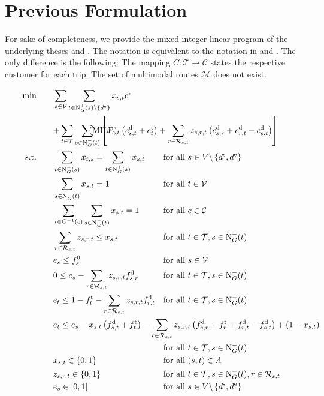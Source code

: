 \section*{Previous Formulation}

For sake of completeness, we provide the mixed-integer linear program of the underlying theses \cite[p.~34]{Kaiser} and \cite[p.~34]{Knoll}. The notation is equivalent to the notation in  and . The only difference is the following: The mapping ${C:\mathcal{T}\to\mathcal{C}}$ states the respective customer for each trip. The set of multimodal routes $\mathcal{M}$ does not exist.

\begin{align}
	\min \qquad & \sum_{s\in\mathcal{V}} \sum_{t\in\Nout(s)\backslash\{d^{\operatorname{e}}\}} x_{s,t}\cv \nonumber \\
	& \omit\rlap{$\displaystyle{ + \sum_{t\in\mathcal{T}} \sum_{s\in\Nin(t)} \left[x_{s,t}\left(\cd_{s,t}+\ct_{t}\right) + \sum_{r\in\Rst} z_{s,r,t}\left(\cd_{s,r}+\cd_{r,t}-\cd_{s,t}\right)\right]}$} \tag{MILP} \label{eq:MILP} \\
	\text{s.t.} \qquad & \sum_{t\in\Nin(s)} x_{t,s} = \sum_{t\in\Nout(s)} x_{s,t} & & \text{for all } s\in V\backslash\left\{d^{\operatorname{s}},d^{\operatorname{e}}\right\} \label{eq:MILP:flow} \\
	& \sum_{s\in\Nin(t)} x_{s,t} = 1 & & \text{for all } t\in\mathcal{V} \label{eq:MILP:vehicles} \\
	& \sum_{t\in C^{-1}(c)} \sum_{s\in\Nin(t)} x_{s,t} = 1 & & \text{for all } c\in\mathcal{C} \label{eq:MILP:customer} \\
	& \sum_{r\in\Rst} z_{s,r,t} \leq x_{s,t} & & \text{for all } t\in\mathcal{T}, s\in\Nin(t) \label{eq:MILP:refuel} \\
	& e_s \leq f_s^0 & & \text{for all } s\in\mathcal{V} \label{eq:MILP:initial_fuel} \\
	& 0 \leq e_s - \sum_{r\in\Rst} z_{s,r,t}\fd_{s,r} & & \text{for all } t\in\mathcal{T}, s\in\Nin(t) \label{eq:MILP:min_fuel} \\
	& e_t \leq 1 - \ft_t - \sum_{r\in\Rst} z_{s,r,t}\fd_{r,t} & & \text{for all } t\in\mathcal{T}, s\in\Nin(t) \label{eq:MILP:max_fuel} \\
	& \omit\rlap{$\displaystyle{e_t \leq e_s - x_{s,t}\left(f_{s,t}^{\operatorname{d}}+f_t^{\operatorname{t}}\right) - \sum_{r\in\Rst} z_{s,r,t}\left(\fd_{s,r}+\ft_r+\fd_{r,t}-\fd_{s,t}\right) + \left(1-x_{s,t}\right)}$} \nonumber \\
	& & & \text{for all } t\in\mathcal{T}, s\in\Nin(t) \label{eq:MILP:fuel_consumption} \\
	& x_{s,t}\in\{0,1\} & & \text{for all } (s,t)\in A \label{eq:MILP:xst} \\
	& z_{s,r,t}\in\{0,1\} & & \text{for all } t\in\mathcal{T},s\in\Nin(t),r\in\Rst \label{eq:MILP:zsrt} \\
	& e_s\in[0,1] & & \text{for all } s\in V\backslash\left\{d^{\operatorname{s}},d^{\operatorname{e}}\right\} \label{eq:MILP:es}
\end{align}